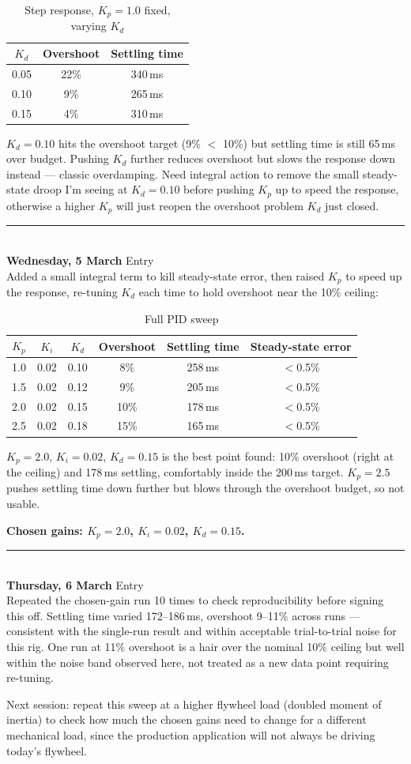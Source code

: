 \documentclass[11pt,a4paper]{article}
\newcounter{entrynum}
\newcommand{\entry}[1]{%
  \stepcounter{entrynum}%
  \par\noindent\rule{\linewidth}{0.6pt}\\[2pt]
  {\bfseries\large #1} \hfill {\small Entry \theentrynum}\\[4pt]
}
\begin{document}
\begin{table}[h]
\centering
\caption{Step response, $K_p = 1.0$ fixed, varying $K_d$}
\begin{tabular}{ccc}
\toprule
$K_d$ & Overshoot & Settling time \\
\midrule
0.05 & 22\% & 340\,ms \\
0.10 & 9\%  & 265\,ms \\
0.15 & 4\%  & 310\,ms \\
\bottomrule
\end{tabular}
\end{table}

$K_d = 0.10$ hits the overshoot target (9\% $<$ 10\%) but settling
time is still 65\,ms over budget. Pushing $K_d$ further reduces
overshoot but slows the response down instead --- classic
overdamping. Need integral action to remove the small steady-state
droop I'm seeing at $K_d = 0.10$ before pushing $K_p$ up to speed
the response, otherwise a higher $K_p$ will just reopen the
overshoot problem $K_d$ just closed.

\entry{Wednesday, 5 March}

Added a small integral term to kill steady-state error, then raised
$K_p$ to speed up the response, re-tuning $K_d$ each time to hold
overshoot near the 10\% ceiling:

\begin{table}[h]
\centering
\caption{Full PID sweep}
\begin{tabular}{cccccc}
\toprule
$K_p$ & $K_i$ & $K_d$ & Overshoot & Settling time & Steady-state error \\
\midrule
1.0 & 0.02 & 0.10 & 8\%  & 258\,ms & $<$0.5\% \\
1.5 & 0.02 & 0.12 & 9\%  & 205\,ms & $<$0.5\% \\
2.0 & 0.02 & 0.15 & 10\% & 178\,ms & $<$0.5\% \\
2.5 & 0.02 & 0.18 & 15\% & 165\,ms & $<$0.5\% \\
\bottomrule
\end{tabular}
\end{table}

$K_p = 2.0$, $K_i = 0.02$, $K_d = 0.15$ is the best point found: 10\%
overshoot (right at the ceiling) and 178\,ms settling, comfortably
inside the 200\,ms target. $K_p = 2.5$ pushes settling time down
further but blows through the overshoot budget, so not usable.

\textbf{Chosen gains: $K_p = 2.0$, $K_i = 0.02$, $K_d = 0.15$.}

\entry{Thursday, 6 March}

Repeated the chosen-gain run 10 times to check reproducibility before
signing this off. Settling time varied 172--186\,ms, overshoot
9--11\% across runs --- consistent with the single-run result and
within acceptable trial-to-trial noise for this rig. One run at
11\% overshoot is a hair over the nominal 10\% ceiling but well
within the noise band observed here, not treated as a new data
point requiring re-tuning.

Next session: repeat this sweep at a higher flywheel load
(doubled moment of inertia) to check how much the chosen gains need
to change for a different mechanical load, since the production
application will not always be driving today's flywheel.
\end{document}
